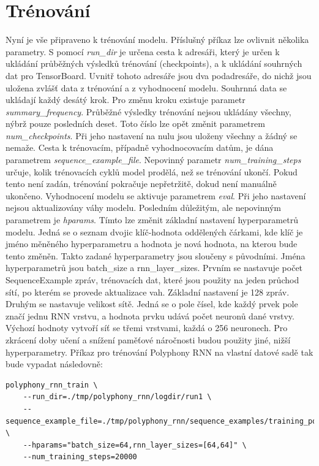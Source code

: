 \section{Trénování}
Nyní je vše připraveno k trénování modelu.
Příslušný příkaz lze ovlivnit několika parametry.
S pomocí \emph{run\_dir} je určena cesta k adresáři,
který je určen k ukládání průběžných výsledků trénování (checkpoints), 
a k ukládání souhrných dat pro TensorBoard.
Uvnitř tohoto adresáře jsou dva podadresáře,
do nichž jsou uložena zvlášť data z trénování a z vyhodnocení modelu.
Souhrnná data se ukládají každý desátý krok.
Pro změnu kroku existuje parametr \emph{summary\_frequency}.
Průběžné výsledky trénování nejsou ukládány všechny, 
nýbrž pouze posledních deset.
Toto číslo lze opět změnit parametrem \emph{num\_checkpoints}.
Při jeho nastavení na nulu jsou uloženy všechny a žádný se nemaže.
Cesta k trénovacím, případně vyhodnocovacím datům, 
je dána parametrem \emph{sequence\_example\_file}.
Nepovinný parametr \emph{num\_training\_steps} určuje,
kolik trénovacích cyklů model prodělá, než se trénování ukončí.
Pokud tento není zadán, trénování pokračuje nepřetržitě, 
dokud není manuálně ukončeno.
Vyhodnocení modelu se aktivuje parametrem \emph{eval}.
Při jeho nastavení nejsou aktualizovány váhy modelu.
Posledním důležitým, ale nepovinným parametrem je \emph{hparams}.
Tímto lze změnit základní nastavení hyperparametrů modelu.
Jedná se o seznam dvojic klíč-hodnota oddělených čárkami,
kde klíč je jméno měněného hyperparametru a hodnota je nová hodnota, 
na kterou bude tento změněn.
Takto zadané hyperparametry jsou sloučeny s původními.
Jména hyperparametrů jsou batch\_size a rnn\_layer\_sizes.
Prvním se nastavuje počet SequenceExample zpráv, trénovacích dat,
které jsou použity na jeden průchod sítí, po kterém se provede aktualizace vah.
Základní nastavení je 128 zpráv.
Druhým se nastavuje velikost sítě.
Jedná se o pole čísel, kde každý prvek pole značí jednu RNN vrstvu,
a hodnota prvku udává počet neuronů dané vrstvy.
Výchozí hodnoty vytvoří síť se třemi vrstvami, 
každá o 256 neuronech. 
\cite{google_git_polyphony}
Pro zkrácení doby učení a snížení paměťové náročnosti budou použity jiné, nižší hyperparametry.
Příkaz pro trénování Polyphony RNN na vlastní datové sadě tak bude vypadat následovně:

\begin{verbatim}
polyphony_rnn_train \
    --run_dir=./tmp/polyphony_rnn/logdir/run1 \
    --sequence_example_file=./tmp/polyphony_rnn/sequence_examples/training_poly_tracks.tfrecord \
    --hparams="batch_size=64,rnn_layer_sizes=[64,64]" \
    --num_training_steps=20000
\end{verbatim}

